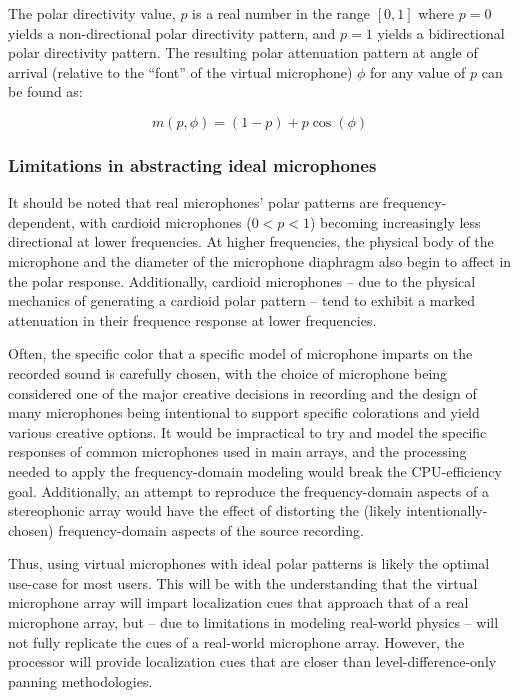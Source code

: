 The polar directivity value, $p$ is a real number in the range $[0,1]$ where $p=0$ yields a non-directional polar directivity pattern, and $p=1$ yields a bidirectional polar directivity pattern. The resulting polar attenuation pattern at angle of arrival (relative to the ``font'' of the virtual microphone) $\phi$ for any value of $p$ can be found as:

\begin{equation}\label{polarPatternPlot}
m(p,\phi) = (1-p) + p\cos(\phi)
\end{equation}

\subsubsection{Limitations in abstracting ideal microphones}

It should be noted that real microphones' polar patterns are frequency-dependent, with cardioid microphones ($0 < p < 1$) becoming increasingly less directional at lower frequencies. At higher frequencies, the physical body of the microphone and the diameter of the microphone diaphragm also begin to affect in the polar response. Additionally, cardioid microphones -- due to the physical mechanics of generating a cardioid polar pattern -- tend to exhibit a marked attenuation in their frequence response at lower frequencies.

Often, the specific color that a specific model of microphone imparts on the recorded sound is carefully chosen, with the choice of microphone being considered one of the major creative decisions in recording and the design of many microphones being intentional to support specific colorations and yield various creative options. It would be impractical to try and model the specific responses of common microphones used in main arrays, and the processing needed to apply the frequency-domain modeling would break the CPU-efficiency goal. Additionally, an attempt to reproduce the frequency-domain aspects of a stereophonic array would have the effect of distorting the (likely intentionally-chosen) frequency-domain aspects of the source recording.

Thus, using virtual microphones with ideal polar patterns is likely the optimal use-case for most users. This will be with the understanding that the virtual microphone array will impart localization cues that approach that of a real microphone array, but -- due to limitations in modeling real-world physics -- will not fully replicate the cues of a real-world microphone array. However, the processor will provide localization cues that are closer than level-difference-only panning methodologies.

